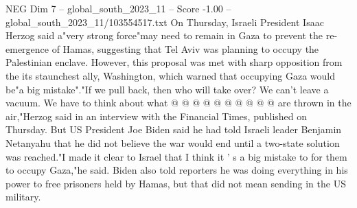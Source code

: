 \begin{textsample}{NEG Dim 7 – global\_south\_2023\_11 – Score -1.00 – global\_south\_2023\_11/103554517.txt}
On Thursday, Israeli President Isaac Herzog said a"very strong force"may need to remain in Gaza to prevent the re-emergence of Hamas, suggesting that Tel Aviv was planning to occupy the Palestinian enclave.
However, this proposal was met with sharp opposition from the its staunchest ally, Washington, which warned that occupying Gaza would be"a big mistake"."If we pull back, then who will take over?
We can't leave a vacuum.
We have to think about what @ @ @ @ @ @ @ @ @ @ are thrown in the air,"Herzog said in an interview with the Financial Times, published on Thursday.
But US President Joe Biden said he had told Israeli leader Benjamin Netanyahu that he did not believe the war would end until a two-state solution was reached."I made it clear to Israel that I think it ' s a big mistake to for them to occupy Gaza,"he said.
Biden also told reporters he was doing everything in his power to free prisoners held by Hamas, but that did not mean sending in the US military.

\end{textsample}

